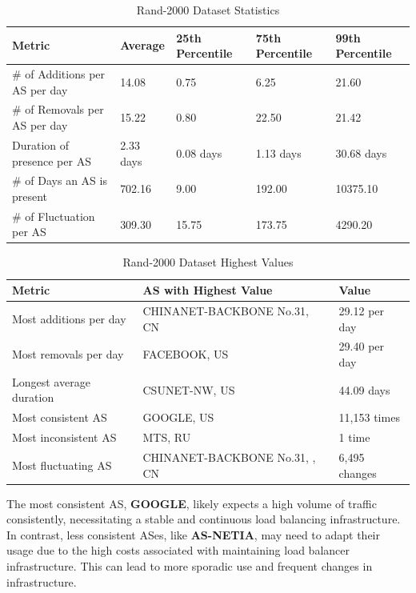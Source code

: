 \documentclass[12pt]{cwru_thesis}
\begin{document}
\begin{table}[h!]
    \centering
    \begin{tabular}{|l|l|l|l|l|}
        \hline
        \textbf{Metric} & \textbf{Average} & \textbf{25th Percentile} & \textbf{75th Percentile} & \textbf{99th Percentile} \\
        \hline
        \# of Additions per AS per day & 14.08 & 0.75 & 6.25 & 21.60 \\
        \hline
        \# of Removals per AS per day & 15.22 & 0.80 & 22.50 & 21.42 \\
        \hline
        Duration of presence per AS & 2.33 days & 0.08 days & 1.13 days & 30.68 days \\
        \hline
        \# of Days an AS is present & 702.16 & 9.00 & 192.00 & 10375.10 \\
        \hline
        \# of Fluctuation per AS & 309.30 & 15.75 & 173.75 & 4290.20 \\
        \hline
    \end{tabular}
    \caption{Rand-2000 Dataset Statistics}
    \label{tab:rand-2000-stats}
\end{table}
\newpage
\begin{table}[h!]
    \centering
    \begin{tabular}{|l|l|l|}
        \hline
        \textbf{Metric} & \textbf{AS with Highest Value} & \textbf{Value} \\
        \hline
        Most additions per day & CHINANET-BACKBONE No.31, CN & 29.12 per day \\
        \hline
        Most removals per day & FACEBOOK, US & 29.40 per day \\
        \hline
        Longest average duration & CSUNET-NW, US & 44.09 days \\
        \hline
        Most consistent AS & GOOGLE, US & 11,153 times \\
        \hline
        Most inconsistent AS & MTS, RU & 1 time \\
        \hline
        Most fluctuating AS & CHINANET-BACKBONE No.31, , CN & 6,495 changes \\
        \hline
    \end{tabular}
    \caption{Rand-2000 Dataset Highest Values}
    \label{tab:rand-2000-highest}
\end{table}

The most consistent AS, \textbf{GOOGLE}, likely expects a high volume of traffic consistently, necessitating a stable and continuous load balancing infrastructure. In contrast, less consistent ASes, like \textbf{AS-NETIA}, may need to adapt their usage due to the high costs associated with maintaining load balancer infrastructure. This can lead to more sporadic use and frequent changes in infrastructure.
\end{document}
